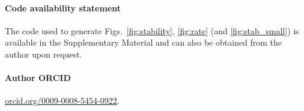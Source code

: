 \documentclass[reqno]{amsart}
\begin{document}
\paragraph*{\bf Code availability statement}
The code used to generate Figs.~\ref{fig:stability}, \ref{fig:rate} (and \ref{fig:stab_small}) is available in the Supplementary Material and can also be obtained from the author upon request.



\paragraph*{\bf Author ORCID}
\href{https://orcid.org/0009-0008-5454-0922}{orcid.org/0009-0008-5454-0922}.




\appendix
\end{document}
